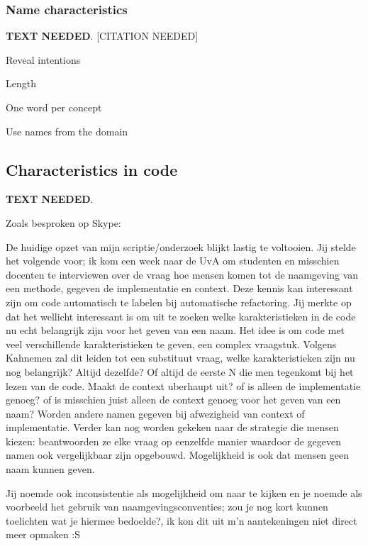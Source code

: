 \subsubsection{Name characteristics}
\label{sec:name-characteristics}

\textbf{TEXT NEEDED}.
{\color{red}[CITATION NEEDED]}

\begin{list}{-}{Characteristics of names in programming:}
\item Reveal intentions
\item Length
\item One word per concept
\item Use names from the domain
\end{list}


\subsection{Characteristics in code}

\textbf{TEXT NEEDED}.

Zoals besproken op Skype:

De huidige opzet van mijn scriptie/onderzoek blijkt lastig te voltooien. Jij stelde het volgende voor; ik kom een week naar de UvA om studenten en misschien docenten te interviewen over de vraag hoe mensen komen tot de naamgeving van een methode, gegeven de implementatie en context. Deze kennis kan interessant zijn om code automatisch te labelen bij automatische refactoring. Jij merkte op dat het wellicht interessant is om uit te zoeken welke karakteristieken in de code nu echt belangrijk zijn voor het geven van een naam. Het idee is om code met veel verschillende karakteristieken te geven, een complex vraagstuk. Volgens Kahnemen zal dit leiden tot een substituut vraag, welke karakteristieken zijn nu nog belangrijk? Altijd dezelfde? Of altijd de eerste N die men tegenkomt bij het lezen van de code. Maakt de context uberhaupt uit? of is alleen de implementatie genoeg? of is misschien juist alleen de context genoeg voor het geven van een naam? Worden andere namen gegeven bij afwezigheid van context of implementatie. Verder kan nog worden gekeken naar de strategie die mensen kiezen: beantwoorden ze elke vraag op eenzelfde manier waardoor de gegeven namen ook vergelijkbaar zijn opgebouwd. Mogelijkheid is ook dat mensen geen naam kunnen geven. 

Jij noemde ook inconsistentie als mogelijkheid om naar te kijken en je noemde als voorbeeld het gebruik van naamgevingsconventies; zou je nog kort kunnen toelichten wat je hiermee bedoelde?, ik kon dit uit m'n aantekeningen niet direct meer opmaken :S


